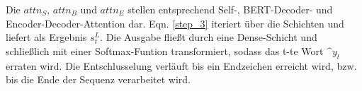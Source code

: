 Die $attn_S$, $attn_B$ und $attn_E$ stellen entsprechend Self-, BERT-Decoder- und Encoder-Decoder-Attention dar. Eqn. \eqref{step_3} iteriert über die Schichten und liefert als Ergebnis $s^L_t$. Die Ausgabe fließt durch eine Dense-Schicht und schließlich mit einer Softmax-Funtion transformiert, sodass das t-te Wort $\^y_t$ erraten wird. Die Entschlusselung verläuft bis ein Endzeichen erreicht wird, bzw. bis die Ende der Sequenz verarbeitet wird.